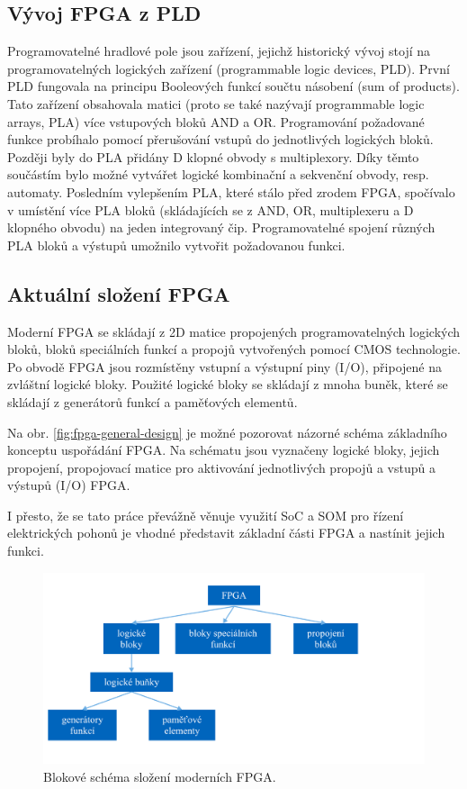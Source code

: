 \documentclass[a4paper, twoside, 11pt]{article}
\begin{document}
		\subsection{Vývoj FPGA z PLD}
		Programovatelné hradlové pole jsou zařízení, jejichž historický vývoj stojí na programovatelných logických zařízení (programmable logic devices, PLD). První PLD fungovala na principu Booleových funkcí součtu násobení (sum of products). Tato zařízení obsahovala matici (proto se také nazývají programmable logic arrays, PLA) více vstupových bloků AND a OR. Programování požadované funkce probíhalo pomocí přerušování vstupů do jednotlivých logických bloků. Později byly do PLA přidány D klopné obvody s multiplexory. Díky těmto součástím bylo možné vytvářet logické kombinační a sekvenční obvody, resp. automaty. Posledním vylepšením PLA, které stálo před zrodem FPGA, spočívalo v umístění více PLA bloků (skládajících se z AND, OR, multiplexeru a D klopného obvodu) na jeden integrovaný čip. Programovatelné spojení různých PLA bloků a výstupů umožnilo vytvořit požadovanou funkci. \cite{Sass2010}\par

		\subsection{Aktuální složení FPGA}
		Moderní FPGA se skládají z 2D matice propojených programovatelných logických bloků, bloků speciálních funkcí a propojů vytvořených pomocí CMOS technologie. Po obvodě FPGA jsou rozmístěny vstupní a výstupní piny (I/O), připojené na zvláštní logické bloky. Použité logické bloky se skládají z mnoha buněk, které se skládají z generátorů funkcí a paměťových elementů. \cite{Sass2010}\par
		Na obr. \ref{fig:fpga-general-design} je možné pozorovat názorné schéma základního konceptu uspořádání FPGA. Na schématu jsou vyznačeny logické bloky, jejich propojení, propojovací matice pro aktivování jednotlivých propojů a vstupů a výstupů (I/O) FPGA.\par
		I přesto, že se tato práce převážně věnuje využití SoC a SOM pro řízení elektrických pohonů je vhodné představit základní části FPGA a nastínit jejich funkci.

		\begin{figure}[htbp!]
			\centering
				\includegraphics[width=1\textwidth]{src/pdf/fpga-skladba.pdf} 
				\caption{Blokové schéma složení moderních FPGA.}
				\label{fig:fpga-skladba}
		\end{figure}
\end{document}
